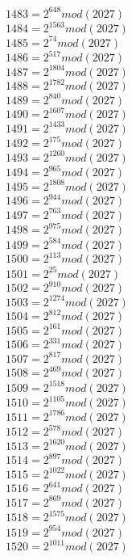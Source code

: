 \documentclass[12pt, letterpaper]{article}
\begin{document}
\begin{itemize}
\begin{multicols}{3}
$1483= 2^{648} mod (2027)$\\
$1484= 2^{1563} mod (2027)$\\
$1485= 2^{74} mod (2027)$\\
$1486= 2^{517} mod (2027)$\\
$1487= 2^{1804} mod (2027)$\\
$1488= 2^{1782} mod (2027)$\\
$1489= 2^{840} mod (2027)$\\
$1490= 2^{1607} mod (2027)$\\
$1491= 2^{1433} mod (2027)$\\
$1492= 2^{175} mod (2027)$\\
$1493= 2^{1260} mod (2027)$\\
$1494= 2^{965} mod (2027)$\\
$1495= 2^{1808} mod (2027)$\\
$1496= 2^{944} mod (2027)$\\
$1497= 2^{763} mod (2027)$\\
$1498= 2^{975} mod (2027)$\\
$1499= 2^{584} mod (2027)$\\
$1500= 2^{113} mod (2027)$\\
$1501= 2^{25} mod (2027)$\\
$1502= 2^{910} mod (2027)$\\
$1503= 2^{1274} mod (2027)$\\
$1504= 2^{812} mod (2027)$\\
$1505= 2^{161} mod (2027)$\\
$1506= 2^{331} mod (2027)$\\
$1507= 2^{817} mod (2027)$\\
$1508= 2^{469} mod (2027)$\\
$1509= 2^{1518} mod (2027)$\\
$1510= 2^{1105} mod (2027)$\\
$1511= 2^{1786} mod (2027)$\\
$1512= 2^{578} mod (2027)$\\
$1513= 2^{1620} mod (2027)$\\
$1514= 2^{897} mod (2027)$\\
$1515= 2^{1022} mod (2027)$\\
$1516= 2^{641} mod (2027)$\\
$1517= 2^{869} mod (2027)$\\
$1518= 2^{1575} mod (2027)$\\
$1519= 2^{954} mod (2027)$\\
$1520= 2^{1011} mod (2027)$\\

\end{multicols}
\end{itemize}
\end{document}
